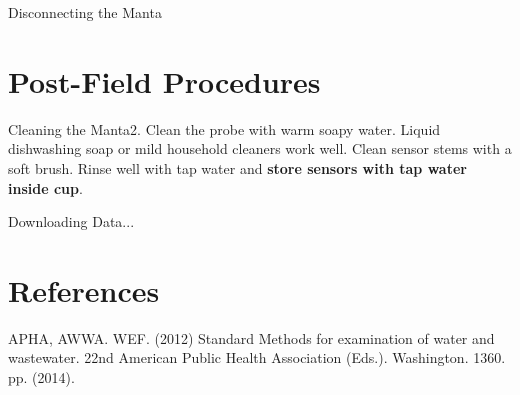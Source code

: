 \documentclass[12pt]{../SOP3_beta}\usepackage[]{graphicx}\usepackage[]{color}
\begin{document}
\NP Disconnecting the Manta

\section{Post-Field Procedures}

\NP Cleaning the Manta2. Clean the probe with warm soapy water. Liquid dishwashing soap or mild household cleaners work well. Clean sensor stems with a soft brush. Rinse well with tap water and \textbf{store sensors with tap water inside cup}.

\NP Downloading Data...

\section{References}

\NP APHA, AWWA. WEF. (2012) Standard Methods for examination of water and wastewater. 22nd American Public Health Association (Eds.). Washington. 1360. pp. (2014).
\end{document}
